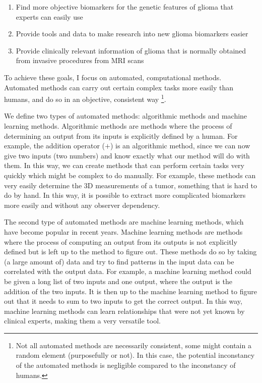 \begin{enumerate}
\item Find more objective biomarkers for the genetic features of \gls{glioma} that experts can easily use
\item Provide tools and data to make research into new glioma biomarkers easier
\item Provide clinically relevant information of glioma that is normally obtained from invasive procedures from \gls{MRI} scans
\end{enumerate}

To achieve these goals, I focus on automated, computational methods.
Automated methods can carry out certain complex tasks more easily than humans, and do so in an objective, consistent way \footnote{Not all automated methods are necessarily consistent, some might contain a random element (purposefully or not). In this case, the potential inconstancy of the automated methods is negligible compared to the inconstancy of humans.}.

We define two types of automated methods: algorithmic methods and machine learning methods.
Algorithmic methods are methods where the process of determining an output from its inputs is explicitly defined by a human.
For example, the addition operator ($+$) is an algorithmic method, since we can now give two inputs (two numbers) and know exactly what our method will do with them.
In this way, we can create methods that can perform certain tasks very quickly which might be complex to do manually.
For example, these methods can very easily determine the 3D measurements of a \gls{tumor}, something that is hard to do by hand.
In this way, it is possible to extract more complicated biomarkers more easily and without any observer dependency.

The second type of automated methods are machine learning methods, which have become popular in recent years.
Machine learning methods are methods where the process of computing an output from its outputs is not explicitly defined but is left up to the method to figure out.
These methods do so by taking (a large amount of) data and try to find patterns in the input data can be correlated with the output data.
For example, a machine learning method could be given a long list of two inputs and one output, where the output is the addition of the two inputs.
It is then up to the machine learning method to figure out that it needs to sum to two inputs to get the correct output.
In this way, machine learning methods can learn relationships that were not yet known by clinical experts, making them a very versatile tool.

